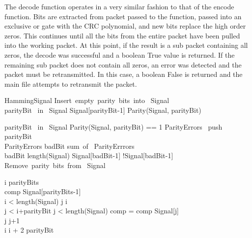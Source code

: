 \documentclass{sigcomm-alternate}
\begin{document}
The decode function operates in a very similar fashion to that of the encode function. Bits are extracted from packet passed to the function, passed into an exclusive or gate with the CRC polynomial, and new bits replace the high order zeros. This continues until all the bits from the entire packet have been pulled into the working packet. At this point, if the result is a sub packet containing all zeros, the decode was successful and a boolean True value is returned. If the remaining sub packet does not contain all zeros, an error was detected and the packet must be retransmitted. In this case, a boolean False is returned and the main file attempts to retransmit the packet.

\begin{pseudocode}{Hamming}{Signal}
		\mbox{Insert empty parity bits into } Signal\\
		\FOREACH parityBit \mbox{ in } Signal \DO
				Signal[parityBit-1] \GETS Parity(Signal, parityBit)\\
	\ENDPROCEDURE

		\FOREACH parityBit \mbox{ in } Signal \DO
			\BEGIN
				\IF Parity(Signal, parityBit) == 1
				\THEN
					ParityErrors \mbox{ push } parityBit
			\END\\
		\IF ParityErrors
		\THEN
			\BEGIN
				badBit \GETS \mbox{sum of } ParityErrrors\\
				\IF badBit \geq length(Signal)
				\THEN
				\ELSE
					Signal[badBit-1] \GETS !Signal[badBit-1]
			\END\\
		\mbox{Remove parity bits from } Signal\\
	\ENDPROCEDURE

		i \GETS parityBits\\
		comp \GETS Signal[parityBits-1]\\
		\WHILE i < length(Signal) \DO
			\BEGIN
				j \GETS i\\
				\WHILE j < i+parityBit \AND j < length(Signal) \DO
					\BEGIN
						comp = comp \oplus Signal[j]\\
						j \GETS j+1
					\END\\
				i \GETS i + 2 \cdot parityBit
			\END\\
	\ENDPROCEDURE
\end{pseudocode}
\end{document}
